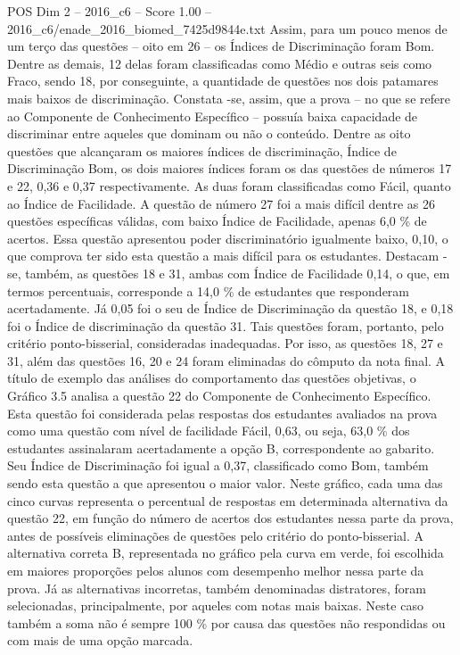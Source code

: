 \begin{textsample}{POS Dim 2 – 2016\_c6 – Score 1.00 – 2016\_c6/enade\_2016\_biomed\_7425d9844e.txt}
Assim, para um pouco menos de um terço das questões – oito em 26 – os Índices de Discriminação foram Bom.
Dentre as demais, 12 delas foram classificadas como Médio e outras seis como Fraco, sendo 18, por conseguinte, a quantidade de questões nos dois patamares mais baixos de discriminação.
Constata -se, assim, que a prova – no que se refere ao Componente de Conhecimento Específico – possuía baixa capacidade de discriminar entre aqueles que dominam ou não o conteúdo.
Dentre as oito questões que alcançaram os maiores índices de discriminação, Índice de Discriminação Bom, os dois maiores índices foram os das questões de números 17 e 22, 0,36 e 0,37 respectivamente.
As duas foram classificadas como Fácil, quanto ao Índice de Facilidade.
A questão de número 27 foi a mais difícil dentre as 26 questões específicas válidas, com baixo Índice de Facilidade, apenas 6,0 \% de acertos.
Essa questão apresentou poder discriminatório igualmente baixo, 0,10, o que comprova ter sido esta questão a mais difícil para os estudantes.
Destacam -se, também, as questões 18 e 31, ambas com Índice de Facilidade 0,14, o que, em termos percentuais, corresponde a 14,0 \% de estudantes que responderam acertadamente.
Já 0,05 foi o seu de Índice de Discriminação da questão 18, e 0,18 foi o Índice de discriminação da questão 31.
Tais questões foram, portanto, pelo critério ponto-bisserial, consideradas inadequadas.
Por isso, as questões 18, 27 e 31, além das questões 16, 20 e 24 foram eliminadas do cômputo da nota final.
A título de exemplo das análises do comportamento das questões objetivas, o Gráfico 3.5 analisa a questão 22 do Componente de Conhecimento Específico.
Esta questão foi considerada pelas respostas dos estudantes avaliados na prova como uma questão com nível de facilidade Fácil, 0,63, ou seja, 63,0 \% dos estudantes assinalaram acertadamente a opção B, correspondente ao gabarito.
Seu Índice de Discriminação foi igual a 0,37, classificado como Bom, também sendo esta questão a que apresentou o maior valor.
Neste gráfico, cada uma das cinco curvas representa o percentual de respostas em determinada alternativa da questão 22, em função do número de acertos dos estudantes nessa parte da prova, antes de possíveis eliminações de questões pelo critério do ponto-bisserial.
A alternativa correta B, representada no gráfico pela curva em verde, foi escolhida em maiores proporções pelos alunos com desempenho melhor nessa parte da prova.
Já as alternativas incorretas, também denominadas distratores, foram selecionadas, principalmente, por aqueles com notas mais baixas.
Neste caso também a soma não é sempre 100 \% por causa das questões não respondidas ou com mais de uma opção marcada.

\end{textsample}
